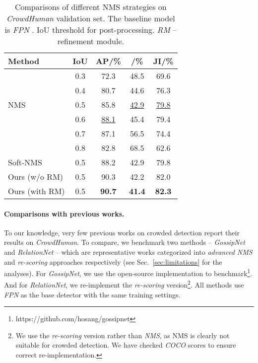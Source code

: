 \documentclass[10pt,twocolumn,letterpaper]{article}
\begin{document}
\begin{table}[t]
	\centering
	\begin{tabular}{l|c|ccc}
\toprule
		Method & IoU & AP/\% & /\%  & JI/\% \\
		\hline
		 & 0.3 & 72.3 & 48.5 & 69.6 \\
		 & 0.4 & 80.7 & 44.6 & 76.3 \\
		NMS & 0.5 & 85.8 & \underline{42.9} & \underline{79.8} \\
		 & 0.6 & \underline{88.1} & 45.4 & 79.4 \\
		 & 0.7 & 87.1 & 56.5 & 74.4 \\
		 & 0.8 & 82.8 & 68.5 & 62.6 \\
		\hline
		 Soft-NMS ~\cite{softnms} & 0.5 & 88.2 & 42.9 & 79.8 \\
		\hline
		Ours (w/o RM) & 0.5 & 90.3 & 42.2 &  82.0  \\
		Ours (with RM) & 0.5 & \textbf{90.7} & \textbf{41.4} & \textbf{82.3} \\
		\bottomrule
	\end{tabular}
	\caption{ Comparisons of different NMS strategies on \emph{CrowdHuman} validation set. The baseline model is \emph{FPN} \cite{lin2017feature}. IoU threshold for post-processing.  \emph{RM} -- refinement module. }
	\label{tbl:crowdhuman_nms}
\end{table} 

\paragraph{Comparisons with previous works. }
To our knowledge, very few previous works on crowded detection  report their results on \emph{CrowdHuman}. To compare, we benchmark two methods -- \emph{GossipNet} \cite{learningnms} and \emph{RelationNet} \cite{hu2017relation}  -- which are representative works categorized into \emph{advanced NMS} and \emph{re-scoring} approaches respectively (see Sec.~\ref{sec:limitations} for the analyses). For \emph{GossipNet}, we use the open-source implementation to benchmark\footnote{https://github.com/hosang/gossipnet}. And for \emph{RelationNet}, we re-implement the \emph{re-scoring} version\footnote{We use the \emph{re-scoring} version rather than \emph{NMS}, as NMS is clearly not suitable for crowded detection. We have checked \emph{COCO} \cite{lin2014microsoft} scores to ensure correct re-implementation.  }. All methods use \emph{FPN} \cite{lin2017feature} as the base detector with the same training settings. 
\end{document}

